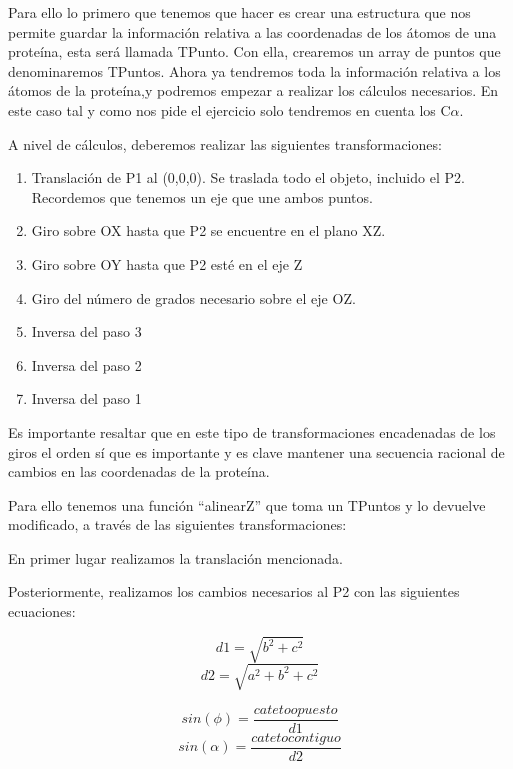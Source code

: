 \documentclass[12pt]{article}
\begin{document}
Para ello lo primero que tenemos que hacer es crear una estructura que nos permite guardar la información relativa a las coordenadas de los átomos de una proteína, esta será llamada TPunto. Con ella, crearemos un array de puntos que denominaremos TPuntos. Ahora ya tendremos toda la información relativa a los átomos de la proteína,y podremos empezar a realizar los cálculos necesarios. En este caso tal y como nos pide el ejercicio solo tendremos en cuenta los C$\alpha$.
\newline

A nivel de cálculos, deberemos realizar las siguientes transformaciones:

\begin{enumerate}
\item Translación de P1 al (0,0,0). Se traslada todo el objeto, incluido el P2. Recordemos que tenemos un eje que une ambos puntos.
\item Giro sobre OX hasta que P2 se encuentre en el plano XZ.
\item Giro sobre OY hasta que P2 esté en el eje Z
\item Giro del número de grados necesario sobre el eje OZ.
\item Inversa del paso 3
\item Inversa del paso 2
\item Inversa del paso 1
\end{enumerate}

Es importante resaltar que en este tipo de transformaciones encadenadas de los giros el orden sí que es importante y es clave mantener una secuencia racional de cambios en las coordenadas de la proteína.
\newline

Para ello tenemos una función ``alinearZ'' que toma un TPuntos y lo devuelve modificado, a través de las siguientes transformaciones:
\newline

En primer lugar realizamos la translación mencionada.
\newline

Posteriormente, realizamos los cambios necesarios al P2 con las siguientes ecuaciones:

\begin{equation}
d1=\sqrt{b^2+c^2}
\end{equation}
\begin{equation}
d2=\sqrt{a^2+b^2+c^2}
\end{equation}

\begin{equation}
sin(\phi)= \frac{cateto opuesto}{d1}
\end{equation}
\begin{equation}
sin(\alpha)= \frac{cateto contiguo}{d2}
\end{equation}
\end{document}
